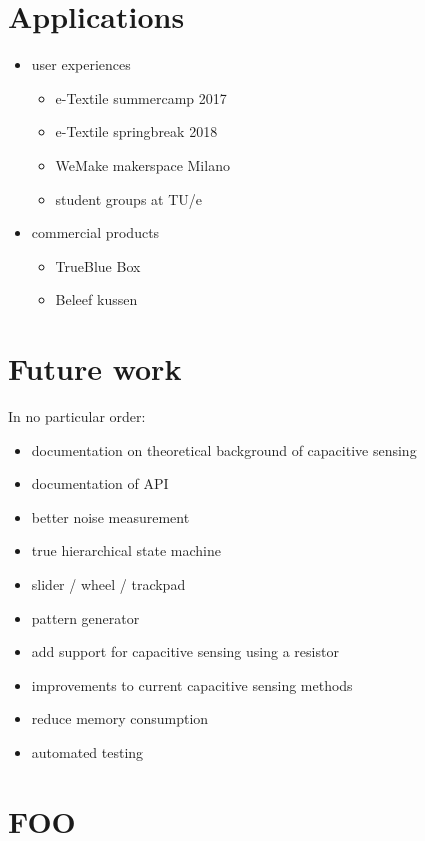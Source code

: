\documentclass[format=sigchi, screen=true, review=true]{acmart}
\begin{document}
\section{Applications}
\begin{itemize}
\item user experiences
	\begin{itemize}
	\item e-Textile summercamp 2017
	\item e-Textile springbreak 2018
	\item WeMake makerspace Milano
	\item student groups at TU/e
\end{itemize}
\item commercial products
	\begin{itemize}
	\item TrueBlue Box
	\item Beleef kussen
	\end{itemize}
\end{itemize}

\section{Future work}
In no particular order:
\begin{itemize}
\item documentation on theoretical background of capacitive sensing
\item documentation of API
\item better noise measurement
\item true hierarchical state machine
\item slider / wheel / trackpad
\item pattern generator
\item add support for capacitive sensing using a resistor
\item improvements to current capacitive sensing methods
\item reduce memory consumption
\item automated testing
\end{itemize}

\section{FOO}
\end{document}
